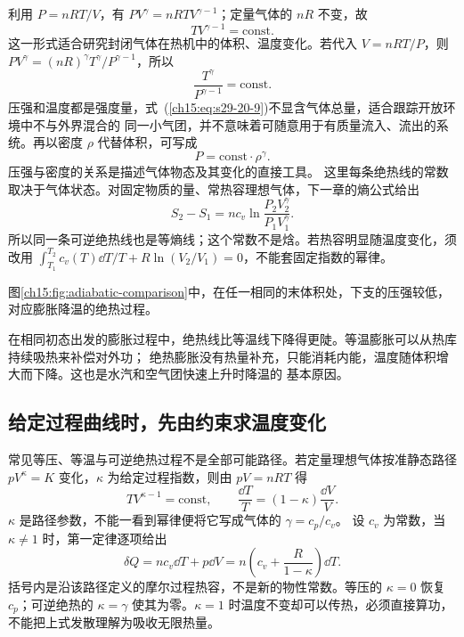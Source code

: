 {利用 $P=nRT/V$，有 $PV^\gamma=nRTV^{\gamma-1}$；定量气体的 $nR$ 不变，故
\begin{equation}
  \boxed{TV^{\gamma-1}=\mathrm{const}}. \label{ch15:eq:s29-20-8}
\end{equation}
这一形式适合研究封闭气体在热机中的体积、温度变化。若代入 $V=nRT/P$，则
$PV^\gamma=(nR)^\gamma T^\gamma/P^{\gamma-1}$，所以
\begin{equation}
  \boxed{\frac{T^\gamma}{P^{\gamma-1}}=\mathrm{const}}. \label{ch15:eq:s29-20-9}
\end{equation}
压强和温度都是强度量，式~(\ref{ch15:eq:s29-20-9})不显含气体总量，适合跟踪开放环境中不与外界混合的
同一小气团，并不意味着可随意用于有质量流入、流出的系统。再以密度
$\rho$ 代替体积，可写成
\begin{equation}
  \boxed{P=\mathrm{const}\cdot\rho^\gamma}. \label{ch15:eq:s29-20-10}
\end{equation}
压强与密度的关系是描述气体物态及其变化的直接工具。
这里每条绝热线的常数取决于气体状态。对固定物质的量、常热容理想气体，下一章的熵公式给出
\[
 S_2-S_1=n c_v\ln\frac{P_2V_2^\gamma}{P_1V_1^\gamma}.
\]
所以同一条可逆绝热线也是等熵线；这个常数不是焓。若热容明显随温度变化，须改用
$\int_{T_1}^{T_2}c_v(T)\dd T/T+R\ln(V_2/V_1)=0$，不能套固定指数的幂律。

\par\noindent\begin{minipage}{\linewidth}
\adiabaticCurvesDiagram
{}\label{ch15:fig:adiabatic-comparison}
\end{minipage}\par\medskip
图\ref{ch15:fig:adiabatic-comparison}中，在任一相同的末体积处，下支的压强较低，对应膨胀降温的绝热过程。

在相同初态出发的膨胀过程中，绝热线比等温线下降得更陡。等温膨胀可以从热库持续吸热来补偿对外功；
绝热膨胀没有热量补充，只能消耗内能，温度随体积增大而下降。这也是水汽和空气团快速上升时降温的
基本原因。

\subsection{给定过程曲线时，先由约束求温度变化}
常见等压、等温与可逆绝热过程不是全部可能路径。若定量理想气体按准静态路径 $pV^{\kappa}=K$ 变化，$\kappa$ 为给定过程指数，则由 $pV=nRT$ 得
\[
 TV^{\kappa-1}=\mathrm{const},\qquad
 \frac{\dd T}{T}=(1-\kappa)\frac{\dd V}{V}.
\]
$\kappa$ 是路径参数，不能一看到幂律便将它写成气体的 $\gamma=c_p/c_v$。
设 $c_v$ 为常数，当 $\kappa\ne1$ 时，第一定律逐项给出
\[
 \delta Q=nc_v\dd T+p\dd V
 =n\left(c_v+\frac{R}{1-\kappa}\right)\dd T.
\]
括号内是沿该路径定义的摩尔过程热容，不是新的物性常数。等压的 $\kappa=0$ 恢复 $c_p$；可逆绝热的 $\kappa=\gamma$ 使其为零。$\kappa=1$ 时温度不变却可以传热，必须直接算功，不能把上式发散理解为吸收无限热量。

}
